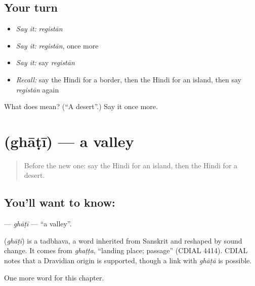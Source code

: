 \subsection*{Your turn}
\begin{itemize}
\raggedright
  \item \emph{Say it:} \emph{registān}
  \item \emph{Say it:} \emph{registān}, once more
  \item \emph{Say it:} say \emph{registān}
  \item \emph{Recall:} say the Hindi for a border, then the Hindi for an island, then say \emph{registān} again
\end{itemize}

\begin{tcolorbox}[breakable,colback=teal!4,colframe=teal!35!black,title={Before you move on}]
What does  mean? (\textquotedblleft{}A desert\textquotedblright{}.) Say it once more.
\end{tcolorbox}
\section[\texorpdfstring{\hi{घाटी} (ghāṭī)}{घाटी (ghāṭī)}]{ (ghāṭī) — a valley}

\label{lesson:HI-C201-ghati}



\begin{quote}
Before the new one: say the Hindi for an island, then the Hindi for a desert.
\end{quote}

\subsection*{You'll want to know: }
\textbf{} — \emph{ghāṭī} — \textquotedblleft{}a valley\textquotedblright{}.

\begin{cousinweb}
\textbf{} (\emph{ghāṭī}) is a tadbhava, a word inherited from Sanskrit and reshaped by sound change. It comes from \emph{ghaṭṭa}, \textquotedblleft{}landing place; passage\textquotedblright{} (CDIAL 4414). CDIAL notes that a Dravidian origin is supported, though a link with \emph{ghāṭā} is possible.
\end{cousinweb}

\begin{grammarlens}[title={What you've built}]
One more word for this chapter.
\end{grammarlens}

